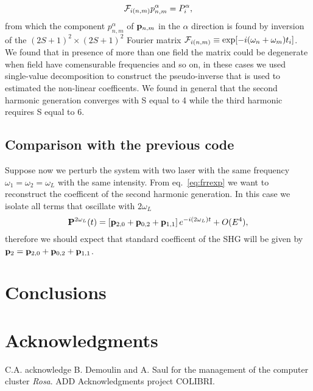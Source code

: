 \documentclass[submission, Phys]{SciPost}
\newcommand{\pp}{{\bf p}}
\newcommand{\PP}{{\bf P}}
\newcommand{\be}{\begin{equation}}
\newcommand{\ee}{\end{equation}}
\renewcommand{\[}{\left[}
\renewcommand{\]}{\right]}
\renewcommand{\(}{\left(}
\renewcommand{\)}{\right)}
\begin{document}
\be
{\cal F}_{i(n,m)} p^\alpha_{n,m} = P^\alpha_i,
\label{eq:fouinv}
\ee 
from which the component $p^\alpha_{n,m}$ of $\pp_{n,m}$ in the $\alpha$ direction is found by inversion of the $(2S+1)^2\times(2S+1)^2$ Fourier matrix ${\cal F}_{i(n,m)} \equiv \exp[-i(\omega_n +\omega_m)t_i]$. We found that in presence of more than one field the matrix could be degenerate when field have comensurable frequencies and so on, in these cases we used single-value decomposition to construct the pseudo-inverse that is used to estimated the non-linear coefficents. We found in general that the second harmonic generation converges with S equal to 4 while the third harmonic requires S equal to 6.
\subsection{Comparison with the previous code}
Suppose now we perturb the system with two laser with the same frequency $\omega_1 = \omega_2 =\omega_L$ with the same intensity. From eq.~\ref{eq:frrexp} we want to reconstruct the coefficent of the second harmonic generation. In this case we isolate all terms that oscillate with $2\omega_L$
\be
\PP^{2\omega_L}(t) =\left [ \pp_{2,0} + \pp_{0,2} +\pp_{1,1} \right ] e^{-i(2\omega_L) t} + O(E^4),
\ee
therefore we should expect that standard coefficent of the SHG will be given by $\pp_{2}= \pp_{2,0} + \pp_{0,2} +\pp_{1,1}$.
\section{Conclusions}
\section*{Acknowledgments}
C.A. acknowledge B. Demoulin and  A. Saul for the management of the computer cluster \emph{Rosa}. ADD Acknowledgments project COLIBRI. 
%

\nolinenumbers
\end{document}
